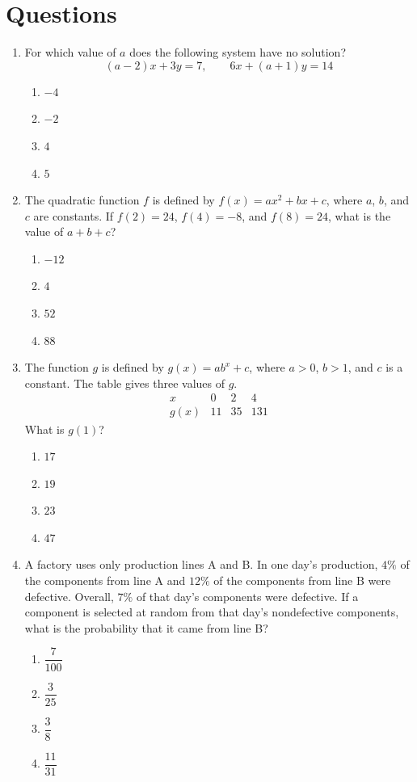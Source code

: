 \documentclass[12pt]{article}
\begin{document}
\section*{Questions}
\begin{enumerate}[leftmargin=*,itemsep=1em]
  \item For which value of $a$ does the following system have no solution?
  \[
    (a-2)x+3y=7,\qquad 6x+(a+1)y=14
  \]
  \begin{enumerate}[label=\Alph*.,itemsep=0pt]
    \item $-4$ \item $-2$ \item $4$ \item $5$
  \end{enumerate}

  \vfill
  \item The quadratic function $f$ is defined by $f(x)=ax^2+bx+c$, where $a$, $b$, and $c$ are constants. If $f(2)=24$, $f(4)=-8$, and $f(8)=24$, what is the value of $a+b+c$?
  \begin{enumerate}[label=\Alph*.,itemsep=0pt]
    \item $-12$ \item $4$ \item $52$ \item $88$
  \end{enumerate}

  \vfill
  \item The function $g$ is defined by $g(x)=ab^x+c$, where $a>0$, $b>1$, and $c$ is a constant. The table gives three values of $g$.
  \[
    \begin{array}{c|ccc}
      x & 0 & 2 & 4 \\\hline
      g(x) & 11 & 35 & 131
    \end{array}
  \]
  What is $g(1)$?
  \begin{enumerate}[label=\Alph*.,itemsep=0pt]
    \item $17$ \item $19$ \item $23$ \item $47$
  \end{enumerate}

  \vfill
  \newpage
  \item A factory uses only production lines A and B. In one day's production, $4\%$ of the components from line A and $12\%$ of the components from line B were defective. Overall, $7\%$ of that day's components were defective. If a component is selected at random from that day's nondefective components, what is the probability that it came from line B?
  \begin{enumerate}[label=\Alph*.,itemsep=0pt]
    \item $\dfrac{7}{100}$ \item $\dfrac{3}{25}$
    \item $\dfrac{3}{8}$ \item $\dfrac{11}{31}$
  \end{enumerate}


\end{enumerate}
\end{document}
